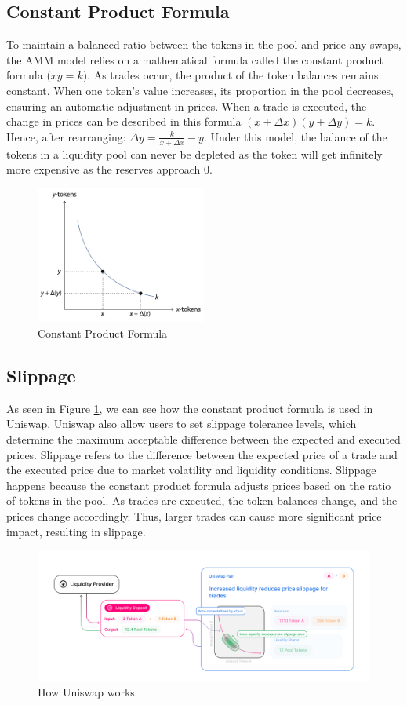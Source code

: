 \subsection{Constant Product Formula}
To maintain a balanced ratio between the tokens in the pool and price any swaps, the AMM model relies on a mathematical formula called the constant product formula ($xy = k$). As trades occur, the product of the token balances remains constant. When one token's value increases, its proportion in the pool decreases, ensuring an automatic adjustment in prices. When a trade is executed, the change in prices can be described in this formula $(x + \Delta x)(y + \Delta y) = k$. Hence, after rearranging: $\Delta y = \frac{k}{x + \Delta x} - y$. Under this model, the balance of the tokens in a liquidity pool can never be depleted as the token will get infinitely more expensive as the reserves approach 0.

\begin{figure}[!htb]
    \centering
    \includegraphics[width=0.5\textwidth]{background/Images/constant_product_formula.png}
    \caption{Constant Product Formula~\cite{schar2021decentralized}}
\end{figure}

\subsection{Slippage}

As seen in Figure \ref{fig:uniswap_lp}, we can see how the constant product formula is used in Uniswap. Uniswap also allow users to set slippage tolerance levels, which determine the maximum acceptable difference between the expected and executed prices. Slippage refers to the difference between the expected price of a trade and the executed price due to market volatility and liquidity conditions. Slippage happens because the constant product formula adjusts prices based on the ratio of tokens in the pool. As trades are executed, the token balances change, and the prices change accordingly. Thus, larger trades can cause more significant price impact, resulting in slippage.

\begin{figure}[!htb]
    \centering
    \includegraphics[width=\textwidth]{background/Images/uniswap_lp.jpeg}
    \caption{How Uniswap works~\cite{uniswap} \label{fig:uniswap_lp}}
\end{figure}

